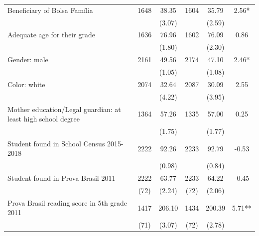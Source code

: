 \documentclass[
	article,			%
	12pt,				%
	oneside,			%
	a4paper,			%
	]{article}
\begin{document}
\begin{table}[h!]
\begin{threeparttable}
\begin{tabular*}{\textwidth}{@{\extracolsep{\fill}}lccccc@{}}
Beneficiary of Bolsa Família &       1648 &      38.35 &       1604 &      35.79 &      2.56* \\

           &            &     (3.07) &            &     (2.59) &            \\

Adequate age for their grade &       1636 &      76.96 &       1602 &      76.09 &       0.86 \\

           &            &     (1.80) &            &     (2.30) &            \\

Gender: male &       2161 &      49.56 &       2174 &      47.10 &      2.46* \\

           &            &     (1.05) &            &     (1.08) &            \\

Color: white &       2074 &      32.64 &       2087 &      30.09 &       2.55 \\

           &            &     (4.22) &            &     (3.95) &            \\

Mother education/Legal guardian: at least high school degree &       1364 &      57.26 &       1335 &      57.00 &       0.25 \\

           &            &     (1.75) &            &     (1.77) &            \\

Student found in School Census 2015-2018 &       2222 &      92.26 &       2233 &      92.79 &      -0.53 \\

           &            &     (0.98) &            &     (0.84) &            \\

Student found in Prova Brasil 2011 &       2222 &      63.77 &       2233 &      64.22 &      -0.45 \\

           &       (72) &     (2.24) &       (72) &     (2.06) &            \\

Prova Brasil reading score in 5th grade 2011 &       1417 &     206.10 &       1434 &     200.39 &     5.71** \\

           &       (71) &     (3.07) &       (72) &     (2.78) &            \\


\end{tabular*}
\end{threeparttable}
\end{table}
\end{document}
